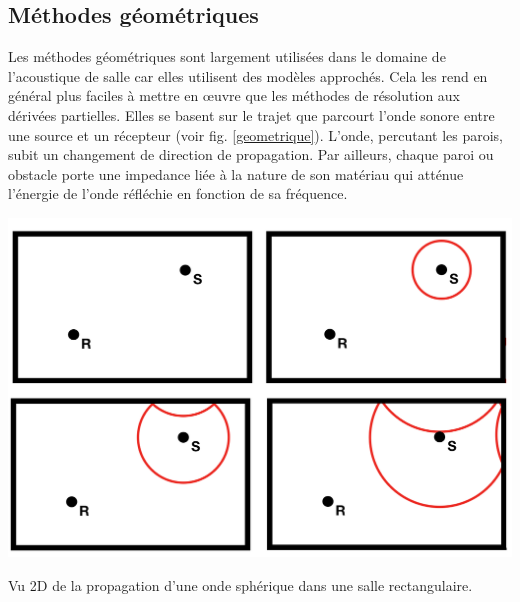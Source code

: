 %
%







	\subsection{Méthodes géométriques} \label{sect_methode_geo}
	
Les méthodes géométriques sont largement utilisées dans le domaine de l'acoustique de salle car elles utilisent des modèles approchés. Cela les rend en général plus faciles à mettre en \oe{}uvre que les méthodes de résolution aux dérivées partielles. Elles se basent sur le trajet que parcourt l'onde sonore entre une source et un récepteur (voir fig. \ref{geometrique}). L'onde, percutant les parois, subit un changement de direction de propagation. Par ailleurs, chaque paroi ou obstacle porte une \gls{impedance} liée à la nature de son matériau qui atténue l'énergie de l'onde réfléchie en fonction de sa fréquence.

\begin{figureth}
	\includegraphics[width=0.8\linewidth]{images/geometrique}
	\caption{Vu 2D de la propagation d'une onde sphérique dans une salle rectangulaire.}
	\label{geometrique}
\end{figureth}

